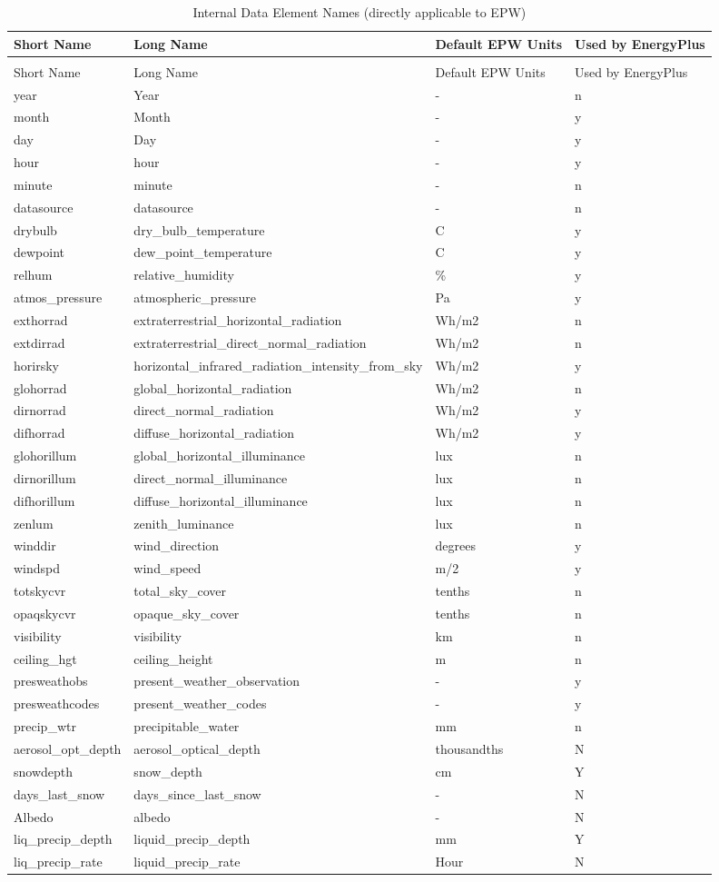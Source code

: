 \begin{longtable}[c]{p{1.5in}p{2.5in}p{1.0in}p{1.0in}}

\caption{Internal Data Element Names (directly applicable to EPW) \label{table:internal-data-element-names-directly}} \tabularnewline
\toprule 
Short Name & Long Name & Default EPW Units & Used by EnergyPlus \tabularnewline
\midrule
\endfirsthead

\caption[]{Internal Data Element Names (directly applicable to EPW)} \tabularnewline
\toprule
Short Name & Long Name & Default EPW Units & Used by EnergyPlus \tabularnewline
\midrule
\endhead

year & Year & - & n \tabularnewline
month & Month & - & y \tabularnewline
day & Day & - & y \tabularnewline
hour & hour & - & y \tabularnewline
minute & minute & - & n \tabularnewline
datasource & datasource & - & n \tabularnewline
drybulb & dry\_bulb\_temperature & C & y \tabularnewline
dewpoint & dew\_point\_temperature & C & y \tabularnewline
relhum & relative\_humidity & \% & y \tabularnewline
atmos\_pressure & atmospheric\_pressure & Pa & y \tabularnewline
exthorrad & extraterrestrial\_horizontal\_radiation & Wh/m2 & n \tabularnewline
extdirrad & extraterrestrial\_direct\_normal\_radiation & Wh/m2 & n \tabularnewline
horirsky & horizontal\_infrared\_radiation\_intensity\_from\_sky & Wh/m2 & y \tabularnewline
glohorrad & global\_horizontal\_radiation & Wh/m2 & n \tabularnewline
dirnorrad & direct\_normal\_radiation & Wh/m2 & y \tabularnewline
difhorrad & diffuse\_horizontal\_radiation & Wh/m2 & y \tabularnewline
glohorillum & global\_horizontal\_illuminance & lux & n \tabularnewline
dirnorillum & direct\_normal\_illuminance & lux & n \tabularnewline
difhorillum & diffuse\_horizontal\_illuminance & lux & n \tabularnewline
zenlum & zenith\_luminance & lux & n \tabularnewline
winddir & wind\_direction & degrees & y \tabularnewline
windspd & wind\_speed & m/2 & y \tabularnewline
totskycvr & total\_sky\_cover & tenths & n \tabularnewline
opaqskycvr & opaque\_sky\_cover & tenths & n \tabularnewline
visibility & visibility & km & n \tabularnewline
ceiling\_hgt & ceiling\_height & m & n \tabularnewline
presweathobs & present\_weather\_observation & - & y \tabularnewline
presweathcodes & present\_weather\_codes & - & y \tabularnewline
precip\_wtr & precipitable\_water & mm & n \tabularnewline
aerosol\_opt\_depth & aerosol\_optical\_depth & thousandths & N \tabularnewline
snowdepth & snow\_depth & cm & Y \tabularnewline
days\_last\_snow & days\_since\_last\_snow & - & N \tabularnewline
Albedo & albedo & - & N \tabularnewline
liq\_precip\_depth & liquid\_precip\_depth & mm & Y \tabularnewline
liq\_precip\_rate & liquid\_precip\_rate & Hour & N \tabularnewline
\bottomrule
\end{longtable}

